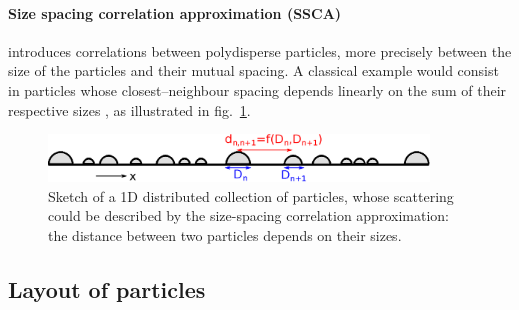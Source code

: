 \paragraph{Size spacing correlation approximation (SSCA)} introduces correlations between polydisperse particles, more precisely between the size of the particles and their mutual spacing. A classical example would consist in particles whose closest--neighbour spacing depends linearly on the sum of their respective sizes \cite{LaLR07}, as illustrated in fig.~\ref{fig:ssca}.


\begin{figure}[ht]
\begin{center}
\includegraphics[width=0.9\textwidth]{Figures/drawing/drawingSSCA.eps}
\end{center}
\caption{Sketch of a 1D distributed collection of particles, whose scattering could be described by the size-spacing correlation approximation: the distance between two particles depends on their sizes.}
\label{fig:ssca}
\end{figure}




\subsection{Layout of particles}\label{sec:partlayout}

